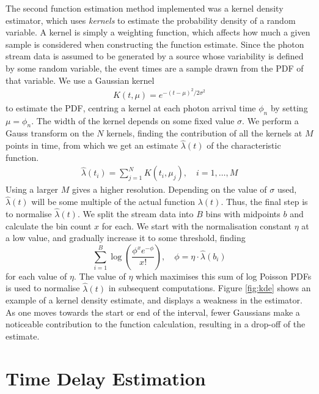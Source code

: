 \documentclass[11pt]{article}
\begin{document}
   The second function estimation method implemented was a kernel density
   estimator, which uses \emph{kernels} to estimate the probability density of a
   random variable. A kernel is simply a weighting function, which affects how
   much a given sample is considered when constructing the function
   estimate. Since the photon stream data is assumed to be generated by a source
   whose variability is defined by some random variable, the event times are a
   sample drawn from the PDF of that variable. We use a Gaussian kernel
   \begin{align}
   K(t,\mu)=e^{-(t-\mu)^2/2\sigma^2}
   \end{align}
   to estimate the PDF, centring a kernel at each photon arrival time $\phi_n$ by
   setting $\mu=\phi_n$. The width of the kernel depends on some fixed value
   $\sigma$. We perform a Gauss transform on the $N$ kernels, finding the
   contribution of all the kernels at $M$ points in time, from which we get an
   estimate $\hat{\lambda}(t)$ of the characteristic function.
   \begin{align}
   \hat{\lambda}(t_i) = \sum_{j=1}^N K(t_i,\mu_j), \quad i=1,\dots,M
   \end{align}
   Using a larger $M$ gives a higher resolution. Depending on the value of
   $\sigma$ used, $\hat{\lambda}(t)$ will be some multiple of the actual
   function $\lambda(t)$. Thus, the final step is to normalise
   $\hat{\lambda}(t)$. We split the stream data into $B$ bins with midpoints $b$
   and calculate the bin count $x$ for each. We start with the normalisation
   constant $\eta$ at a low value, and gradually increase it to some threshold,
   finding
   \begin{equation}\label{eq:normcalc}
   \sum_{i=1}^B
   \log\left(\frac{\phi^xe^{-\phi}}{x!}\right), \quad \phi=\eta\cdot\hat{\lambda}(b_i)
   \end{equation}
   for each value of $\eta$. The value of $\eta$ which maximises this sum of log
   Poisson PDFs is used to normalise $\hat{\lambda}(t)$ in subsequent
   computations. Figure \ref{fig:kde} shows an example of a kernel density
   estimate, and displays a weakness in the estimator. As one moves towards the
   start or end of the interval, fewer Gaussians make a noticeable contribution
   to the function calculation, resulting in a drop-off of the estimate.
\section{Time Delay Estimation}
\label{sec-5}
\end{document}
